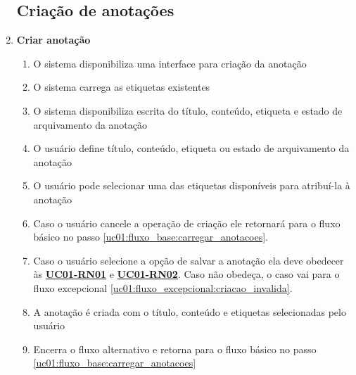 \documentclass[
	12pt,				%
	oneside,			%
	a4paper,			%
	english,			%
	brazil,				%
	]{abntex2}
\begin{document}
\begin{enumerate}[label=\textbf{UC01-FA{\arabic*}},font=\normalsize]
    \subsection{Criação de anotações}
    \item \textbf{\normalsize Criar anotação} \label{uc01:fluxo_alternativo:criar_anotacao}
    \begin{enumerate}[label={\arabic*}.]
        \item O sistema disponibiliza uma interface para criação da anotação
        \item O sistema carrega as etiquetas existentes
        \item O sistema disponibiliza escrita do título, conteúdo, etiqueta e estado de arquivamento da anotação
        \item O usuário define título, conteúdo, etiqueta ou estado de arquivamento da anotação \label{uc01:fluxo_alternativo:criar_anotacao:pode_escrever}
        \item O usuário pode selecionar uma das etiquetas disponíveis para atribuí-la à anotação
        \item Caso o usuário cancele a operação de criação ele retornará para o fluxo básico no passo \ref{uc01:fluxo_base:carregar_anotacoes}.
        \item Caso o usuário selecione a opção de salvar a anotação ela deve obedecer às \textbf{\hyperref[uc01:rn01_validacao_anotacao]{UC01-RN01}} e \textbf{\hyperref[uc01:rn02_flag_arquivar]{UC01-RN02}}. Caso não obedeça, o caso vai para o fluxo excepcional \ref{uc01:fluxo_excepcional:criacao_invalida}.
        \item A anotação é criada com o título, conteúdo e etiquetas selecionadas pelo usuário
        \item Encerra o fluxo alternativo e retorna para o fluxo básico no passo \ref{uc01:fluxo_base:carregar_anotacoes}
    \end{enumerate}
    

\end{enumerate}
\end{document}
